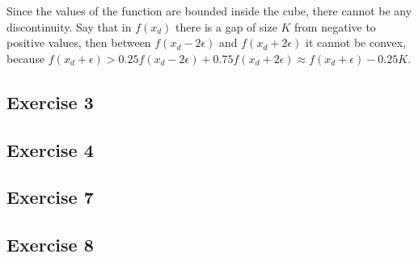 \documentclass[twoside,11pt]{article}
\begin{document}
Since the values of the function are bounded inside the cube, there cannot be any discontinuity. Say that in $f(x_d)$ there is a gap of size $K$ from negative to positive values, then between $f(x_d - 2\epsilon)$ and $f(x_d + 2\epsilon)$ it cannot be convex, because $f(x_d + \epsilon) > 0.25 f(x_d - 2\epsilon) + 0.75 f(x_d + 2\epsilon) \approx f(x_d + \epsilon) - 0.25K$.

\subsection{Exercise 3}

\subsection{Exercise 4}

\subsection{Exercise 7}

\subsection{Exercise 8}
	
\end{document}
